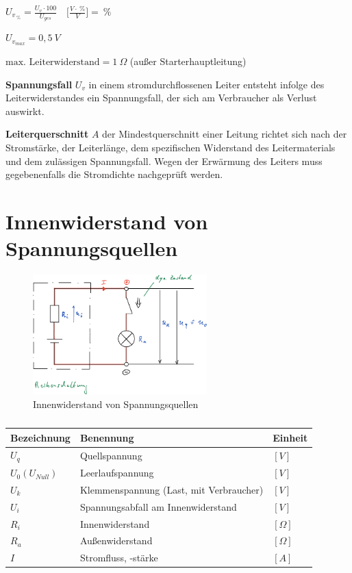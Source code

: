 $U_{v_{~\%}} = \frac{U_v \cdot 100}{U_{ges}} \quad \bigl[\frac{V \cdot ~\%}{V}\bigl] = ~\%$

$\boxed{U_{v_{max}} = 0,5~V}$

$\boxed{\text{max. Leiterwiderstand} = 1~\Omega}$ (außer
Starterhauptleitung)

\textbf{Spannungsfall} $U_v$ in einem stromdurchflossenen Leiter
entsteht infolge des Leiterwiderstandes ein Spannungsfall, der sich am
Verbraucher als Verlust auswirkt.

\textbf{Leiterquerschnitt} $A$ der Mindestquerschnitt einer Leitung
richtet sich nach der Stromstärke, der Leiterlänge, dem spezifischen
Widerstand des Leitermaterials und dem zulässigen Spannungsfall. Wegen
der Erwärmung des Leiters muss gegebenenfalls die Stromdichte
nachgeprüft werden.

\newpage

\section{Innenwiderstand von
Spannungsquellen}\label{innenwiderstand-von-spannungsquellen}

\begin{figure}[!ht]%
\centering
\includegraphics[width=0.6\textwidth]{images/Skizze/14_ Innenwiderstand_von_Spannungsquellen_Skizze.pdf}
\caption{Innenwiderstand von Spannungsquellen}
\end{figure}

\begin{table}[!ht]%
\centering 
	\caption{}%
\begin{tabular}{@{}lll@{}}
\hline
\textbf{Bezeichnung} & \textbf{Benennung} & \textbf{Einheit} \\
\hline
$U_q$ & Quellspannung & $[V]$ \\
$U_0 (U_{Null})$ & Leerlaufspannung & $[V]$ \\
$U_k$ & Klemmenspannung (Last, mit Verbraucher) & $[V]$ \\
$U_i$ & Spannungsabfall am Innenwiderstand & $[V]$ \\
$R_i$ & Innenwiderstand & $[\Omega]$ \\
$R_a$ & Außenwiderstand & $[\Omega]$ \\
$I$ & Stromfluss, -stärke & $[A]$ \\
\hline
\end{tabular} 
\end{table}

